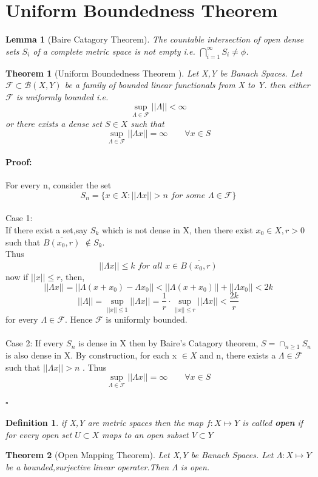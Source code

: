 \documentclass{article}
\newenvironment{proof}{\paragraph{Proof:}}{\hfill$\square$}
\newtheorem{definition}{Definition}[section]
\newtheorem{theorem}{Theorem}[section]
\newtheorem{lemma}{Lemma}[section]
\begin{document}
\section{Uniform Boundedness Theorem}
\begin{lemma}[Baire Catagory Theorem]
The countable intersection of open dense sets $ S_i$ of a complete metric space is not empty i.e. $\bigcap_{i=1}^\infty S_i \not= \phi$.    
\end{lemma}
\begin{theorem}[Uniform Boundedness Theorem ]
    Let X,Y be Banach Spaces. Let $\mathcal{F} \subset \mathcal{B} (X,Y) $ be a family of bounded linear functionals from X to Y. then either $\mathcal{F} $ is uniformly bounded i.e. $$\sup_{\Lambda \in \mathcal{F} } ||\Lambda  ||< \infty$$ or there exists a dense set  $S \in X$ such that $$\sup_{\Lambda \in \mathcal{F} } ||\Lambda x||= \infty  \qquad \forall x\in S$$
\end{theorem}
\begin{proof}
    For every n, consider the set $$S_n = \{ x\in X: ||\Lambda x ||>n  \textit{  for some } \Lambda \in \mathcal{F}   \}$$
\\Case 1: \\
If there exist a set,say $S_k$ which is not dense in X, then there exist $x_0 \in X, r > 0 $ such that $\overline{B(x_0,r)}$ $\notin S_k$. 
\\ Thus $$||\Lambda x ||\leq k     \textit{       for all $x \in \overline{B(x_0,r)}$}$$   
now if $||x||\leq r$, then, $$||\Lambda x||=||\Lambda(x+x_0)-\Lambda x_0||< ||\Lambda(x+x_0)||+||\Lambda x_0||<2k$$
$$||\Lambda||= \sup_{||x||\leq 1 } ||\Lambda x || = \frac{1}{r} \cdot \sup_{||x||\leq r } ||\Lambda x ||< \frac{2k}{r} $$
for every $\Lambda \in \mathcal{F} $. Hence $\mathcal{F} $ is uniformly bounded.
\\ \\ 
Case 2: If every $S_n$ is dense in X then by Baire's Catagory theorem, $S = \cap_{n\geq 1} S_n $ is also dense in X. By construction, for each x $\in X$ and n, there exists a $\Lambda \in \mathcal{F} $ such that $||\Lambda x ||>n $ . Thus $$\sup_{\Lambda \in \mathcal{F} } ||\Lambda x||= \infty  \qquad \forall x\in S$$

\end{proof}
\begin{definition}
    if X,Y are metric spaces then the map $f : X \mapsto Y$ is called \textbf{open} if for every open set $U \subset X$ maps to an open subset $V \subset Y$ 
\end{definition}
\begin{theorem}[Open Mapping Theorem]
    Let X,Y be Banach Spaces. Let $\Lambda: X \mapsto Y $ be a bounded,surjective linear operater.Then $\Lambda$ is open.  
\end{theorem}
\end{document}

